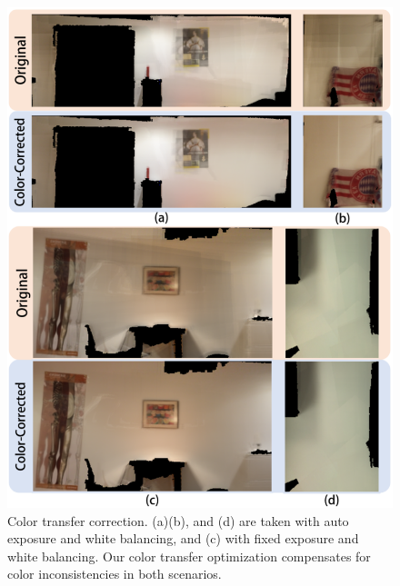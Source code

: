\begin{figure}
\begin{minipage}{0.49\linewidth}
\end{minipage}
\begin{minipage}{0.49\linewidth}
\centering
\includegraphics[width=0.8\linewidth]{3dlite/fig18.png}
\caption{Color transfer correction. (a)(b), and (d) are taken with auto exposure and white balancing, and (c) with fixed exposure and white balancing. Our color transfer optimization compensates for color inconsistencies in both scenarios. }
\label{fig:3dlite-eval-color-transfer}
\end{minipage}
\end{figure}

